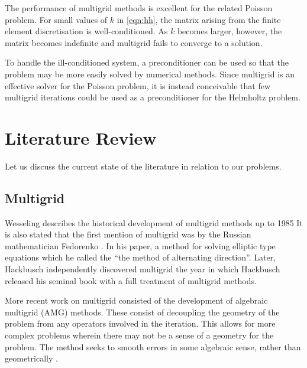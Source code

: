 The performance of multigrid methods is excellent for the related Poisson problem.
For small values of $k$ in \eqref{eqn:hh}, the matrix arising from the finite element discretisation is well-conditioned.
As $k$ becomes larger, however, the matrix becomes indefinite and multigrid fails to converge to a solution.

To handle the ill-conditioned system, a preconditioner can be used so that the problem may be more easily solved by numerical methods.
Since multigrid is an effective solver for the Poisson problem, it is instead conceivable that few multigrid iterations could be used as a preconditioner for the Helmholtz problem.





\section{Literature Review}

\iffalse

Topics to cover:
	Solving Poisson problem
	Solving Helmholtz
	Complex shifted laplacian
	Multigrid
	Cylindrical coordinates

Mention one or two references for each, try and reach >2 pages.

\fi

Let us discuss the current state of the literature in relation to our problems.

\subsection{Multigrid}

Wesseling \cite{wesseling} describes the historical development of multigrid methods up to 1985
It is also stated that the first mention of multigrid was by the Russian mathematician Fedorenko \cite{fedorenko}.
In his paper, a method for solving elliptic type equations which he called the ``the method of alternating direction''.
Later, Hackbusch independently discovered multigrid
the year in which Hackbusch \cite{hackbusch} released his seminal book with a full treatment of multigrid methods.


More recent work on multigrid consisted of the development of algebraic multigrid (AMG) methods.
These consist of decoupling the geometry of the problem from any operators involved in the iteration.
This allows for more complex problems wherein there may not be a sense of a geometry for the problem.
The method seeks to smooth errors in some algebraic sense, rather than geometrically \cite{}.%

